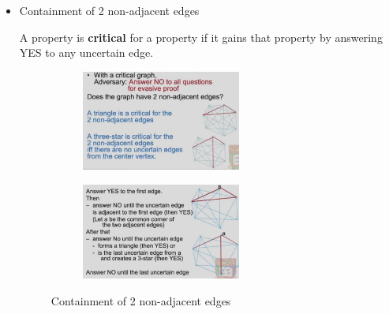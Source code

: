 \begin{itemize}
    \item Containment of 2 non-adjacent edges
    \begin{definition}
        A property is \textbf{critical} for a property if it gains that property by answering YES to any uncertain edge.
    \end{definition}
    \begin{figure}[H]
        \centering
        \begin{subfigure}{0.48\textwidth}
            \centering
            \includegraphics[width=0.618\textwidth]{pic/DAA5/Containment of 2 non-adjacent edges}
        \end{subfigure}
        \begin{subfigure}{0.48\textwidth}
            \centering
            \includegraphics[width=0.618\textwidth]{pic/DAA5/Containment of 2 non-adjacent edges proof.png}
        \end{subfigure}
        \caption{Containment of 2 non-adjacent edges}
    \end{figure}
    

\end{itemize}
